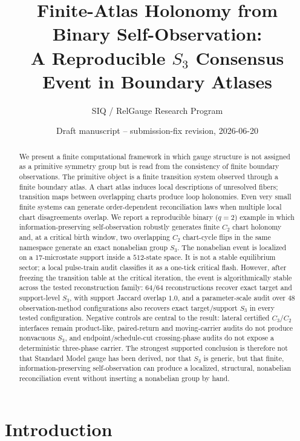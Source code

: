\documentclass[11pt]{article}
\title{Finite-Atlas Holonomy from Binary Self-Observation:\\
A Reproducible $S_3$ Consensus Event in Boundary Atlases}
\author{SIQ / RelGauge Research Program}
\date{Draft manuscript -- submission-fix revision, 2026-06-20}
\begin{document}
\maketitle

\begin{abstract}
We present a finite computational framework in which gauge structure is not assigned as a primitive symmetry group but is read from the consistency of finite boundary observations.  The primitive object is a finite transition system observed through a finite boundary atlas.  A chart atlas induces local descriptions of unresolved fibers; transition maps between overlapping charts produce loop holonomies.  Even very small finite systems can generate order-dependent reconciliation laws when multiple local chart disagreements overlap.  We report a reproducible binary ($q=2$) example in which information-preserving self-observation robustly generates finite $C_2$ chart holonomy and, at a critical birth window, two overlapping $C_2$ chart-cycle flips in the same namespace generate an exact nonabelian group $S_3$.  The nonabelian event is localized on a $17$-microstate support inside a $512$-state space.  It is not a stable equilibrium sector; a local pulse-train audit classifies it as a one-tick critical flash.  However, after freezing the transition table at the critical iteration, the event is algorithmically stable across the tested reconstruction family: $64/64$ reconstructions recover exact target and support-level $S_3$, with support Jaccard overlap $1.0$, and a parameter-scale audit over $48$ observation-method configurations also recovers exact target/support $S_3$ in every tested configuration.  Negative controls are central to the result: lateral certified $C_3/C_2$ interfaces remain product-like, paired-return and moving-carrier audits do not produce nonvacuous $S_3$, and endpoint/schedule-cut crossing-phase audits do not expose a deterministic three-phase carrier.  The strongest supported conclusion is therefore not that Standard Model gauge has been derived, nor that $S_3$ is generic, but that finite, information-preserving self-observation can produce a localized, structural, nonabelian reconciliation event without inserting a nonabelian group by hand.
\end{abstract}

\tableofcontents
\newpage

\section{Introduction}
\end{document}

